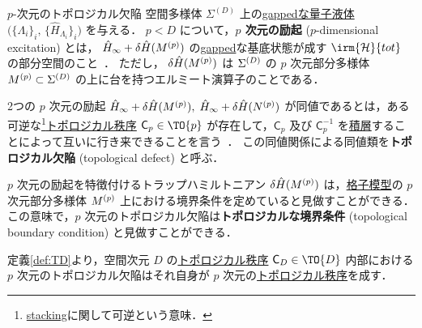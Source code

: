 \documentclass[TQFT_main]{subfiles}
\begin{document}
\begin{mydefph}[label=def:TD]{$p$-次元のトポロジカル欠陥}
    空間多様体 $\Sigma^{(D)}$ 上の\hyperref[def:gappedQL]{gappedな量子液体} $\bigl( \{\Lambda_i\}_i,\, \{\hat{H}_{\Lambda_i}\}_i \bigr)$ を与える．
    $p < D$ について，\textbf{$p$ 次元の励起} ($p$-dimensional excitation) とは，
    $\hat{H}_{\infty} + \delta \hat{H}(M^{(p)})$ の\hyperref[def:gapped]{gapped}な基底状態が成す $\irm{\mathcal{H}}{tot}$ の部分空間のこと~\cite[Definition 5., p.10]{KongWen2014braidedfusioncategoriesgravitational}．
    ただし， $\delta \hat{H}(M^{(p)})$ は $\Sigma^{(D)}$ の $p$ 次元部分多様体 $M^{(p)} \subset \Sigma^{(D)}$ の上に台を持つエルミート演算子のことである．

    \tcblower

    2つの $p$ 次元の励起 $\hat{H}_{\infty} + \delta \hat{H}(M^{(p)}),\; \hat{H}_{\infty} + \delta \hat{H}(N^{(p)})$ が同値であるとは，ある可逆な\footnote{\hyperref[def:stacking]{stacking}に関して可逆という意味．}\hyperref[def:quantum-phase]{トポロジカル秩序} $\mathsf{C}_p \in \TO{p}$ が存在して，$\mathsf{C}_p$ 及び $\mathsf{C}_p^{-1}$ を\hyperref[def:stacking]{積層}することによって互いに行き来できることを言う~\cite[Definition 6., p.10]{KongWen2014braidedfusioncategoriesgravitational}．
    この同値関係による同値類を\textbf{トポロジカル欠陥} (topological defect) と呼ぶ．
\end{mydefph}

\begin{marker}
    $p$ 次元の励起を特徴付けるトラップハミルトニアン $\delta \hat{H}(M^{(p)})$ は，\hyperref[def:bosonic-lattice-model]{格子模型}の $p$ 次元部分多様体 $M^{(p)}$ 上における境界条件を定めていると見做すことができる．
    この意味で，$p$ 次元のトポロジカル欠陥は\textbf{トポロジカルな境界条件} (topological boundary condition) と見做すことができる．
\end{marker}

定義\ref{def:TD}より，空間次元 $D$ の\hyperref[def:quantum-phase]{トポロジカル秩序} $\mathsf{C}_D \in \TO{D}$ 内部における $p$ 次元のトポロジカル欠陥はそれ自身が $p$ 次元の\hyperref[def:quantum-phase]{トポロジカル秩序}を成す．
\end{document}
